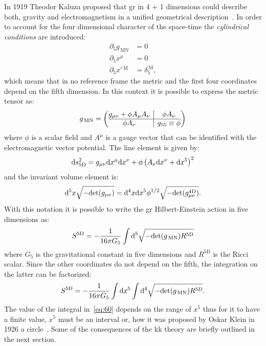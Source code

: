 In 1919 Theodor Kaluza proposed that \gls{gr} in 4 + 1 dimensions could describe
both, gravity and electromagnetism in a unified geometrical
description~\cite{Kaluza}. In order to account for the four dimensional
character of the space-time the \emph{cylindrical conditions} are introduced:
\begin{equation}
  \label{eq:55}
  \begin{aligned}
    \partial_5 g_\mathrm{\, MN} & = 0 \\
    \partial_5 x^\mu & = 0 \\
    \partial_5 x'{^\mathrm{\, M}} & = \delta^\mathrm{\, M}_{5},
  \end{aligned}
\end{equation}
which means that in no reference frame the metric and the first four coordinates
depend on the fifth dimension. In this context it is possible to express the
metric tensor as:
\begin{equation}
  \label{eq:56}
  g_{\mathrm{\, MN}} =
  \left(
    \begin{array}{@{}c|c@{}}
      g_{\mu\nu} + \phi A_\mu A_\nu & \phi A_\nu \\
      \hline
      \phi A_\nu & g_{55} \equiv \phi
    \end{array}
  \right)
\end{equation}
where $\phi$ is a scalar field and $A^\mu$ is a gauge vector that can be
identified with the electromagnetic vector potential. The line element is given
by:
\begin{equation}
  \label{eq:57}
  \mathrm{d} s^2_{5 \mathrm{D}} = g_{\mu\nu} \mathrm{d} x^\mu \mathrm{d} x^\nu + \phi \left( A_\nu
    \mathrm{d} x^\nu + \mathrm{d} x^5 \right)^2
\end{equation}
and the invariant volume element is:
\begin{equation}
  \label{eq:58}
  \mathrm{d}^5 x \sqrt{- \mathrm{det}(g_{\mu\nu})} = \mathrm{d}^4 x \mathrm{d} x^5 \phi^{1/2} \sqrt{-
  \mathrm{det}(g_{\mu\nu}^{4 \mathrm{D}})}.
\end{equation}
With this notation it is possible to write the \gls{gr} Hilbert-Einstein action
in five dimensions as:
\begin{equation}
  \label{eq:59}
  S^{5 \mathrm{D}} = - \frac{1}{16 \pi G_5} \int \mathrm{d}^5 \sqrt{-
    \mathrm{det}(g_{\mathrm{\, MN}}) R^{5 \mathrm{D}}}
\end{equation}
where $G_5$ is the gravitational constant in five dimensions and $R^{5
  \mathrm{D}}$ is the Ricci scalar. Since the other coordinates do not depend on
the fifth, the integration on the latter can be factorized:
\begin{equation}
  \label{eq:60}
  S^{5 \mathrm{D}} = - \frac{1}{16 \pi G_5} \int \mathrm{d} x^5 \int \mathrm{d}^4 \sqrt{-
    \mathrm{det}(g_{\mathrm{\, MN}}) R^{5 \mathrm{D}}}.
\end{equation}
The value of the integral in~\cref{eq:60} depends on the range of $x^5$ thus
for it to have a finite value, $x^5$ must be an interval or, how it was proposed
by Oskar Klein in 1926 a circle~\cite{Klein}. Some of the consequences of the
\gls{kk} theory are briefly outlined in the next section.

